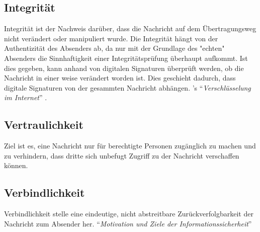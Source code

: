 \subsection{Integrität}

Integrität ist der Nachweis darüber, dass die Nachricht auf dem Übertragungsweg nicht verändert oder manipuliert wurde.
Die Integrität hängt von der Authentizität des Absenders ab, da nur mit der Grundlage des "echten" Absenders die Sinnhaftigkeit einer Integritätsprüfung überhaupt aufkommt.
Ist dies gegeben, kann anhand von digitalen Signaturen überprüft werden, ob die Nachricht in einer weise verändert worden ist.
Dies geschieht dadurch, dass digitale Signaturen von der gesammten Nachricht abhängen.
\citeauthor{richter}'s ``\emph{Verschlüsselung im Internet}'' \citep{richter}.


\subsection{Vertraulichkeit}
Ziel ist es, eine Nachricht nur für berechtigte Personen zugänglich zu machen und zu verhindern, dass dritte sich unbefugt Zugriff zu der Nachricht verschaffen können.


\subsection{Verbindlichkeit}
Verbindlichkeit stelle eine eindeutige, nicht abstreitbare Zurückverfolgbarkeit der Nachricht zum Absender her.
\citeauthor{wiki:itsec} ``\emph{Motivation und Ziele der Informationssicherheit}'' \citep{wiki:itsec}